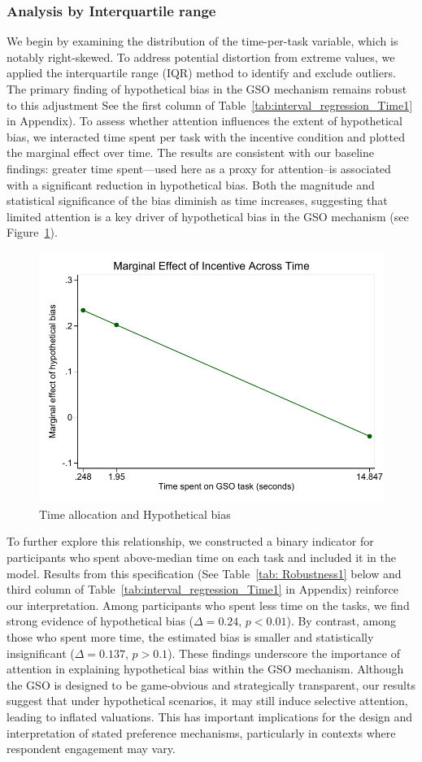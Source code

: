 \documentclass[12pt]{article}
\begin{document}
\subsubsection{Analysis by Interquartile range}

We begin by examining the distribution of the time-per-task variable, which is notably right-skewed. To address potential distortion from extreme values, we applied the interquartile range (IQR) method to identify and exclude outliers. The primary finding of hypothetical bias in the GSO mechanism remains robust to this adjustment See the first column of Table~\ref{tab:interval_regression_Time1} in Appendix). To assess whether attention influences the extent of hypothetical bias, we interacted time spent per task with the incentive condition and plotted the marginal effect over time. The results are consistent with our baseline findings: greater time spent—used here as a proxy for attention--is associated with a significant reduction in hypothetical bias. Both the magnitude and statistical significance of the bias diminish as time increases, suggesting that limited attention is a key driver of hypothetical bias in the GSO mechanism  (see Figure~\ref{fig:Time_spent hypo}). 

\begin{figure}[H]
    \centering
    \includegraphics[width=0.5\linewidth]{Model991.pdf}
    \caption{Time allocation and Hypothetical bias}
    \label{fig:Time_spent hypo}
\end{figure}

To further explore this relationship, we constructed a binary indicator for participants who spent above-median time on each task and included it in the model. Results from this specification (See Table~\ref{tab: Robustness1} below and third column of Table~\ref{tab:interval_regression_Time1} in Appendix) reinforce our interpretation. Among participants who spent less time on the tasks, we find strong evidence of hypothetical bias (\(\Delta = 0.24\), \(p < 0.01\)). By contrast, among those who spent more time, the estimated bias is smaller and statistically insignificant (\(\Delta = 0.137\), \(p >0.1\)). These findings underscore the importance of attention in explaining hypothetical bias within the GSO mechanism. Although the GSO is designed to be game-obvious and strategically transparent, our results suggest that under hypothetical scenarios, it may still induce selective attention, leading to inflated valuations. This has important implications for the design and interpretation of stated preference mechanisms, particularly in contexts where respondent engagement may vary.
\end{document}
